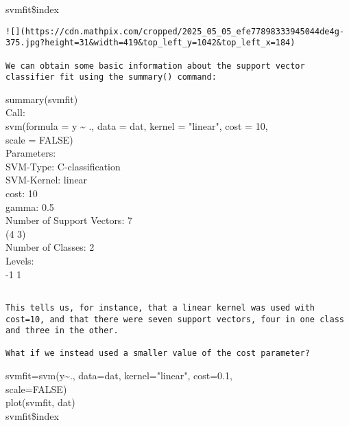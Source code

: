 \documentclass[10pt]{article}
\begin{document}
\begin{displayquote}
svmfit\$index
\end{displayquote}

\begin{verbatim}
![](https://cdn.mathpix.com/cropped/2025_05_05_efe77898333945044de4g-375.jpg?height=31&width=419&top_left_y=1042&top_left_x=184)

We can obtain some basic information about the support vector classifier fit using the summary() command:
\end{verbatim}

\begin{displayquote}
summary(svmfit)\\
Call:\\
svm(formula = y \~{} ., data = dat, kernel = "linear", cost = 10,\\
scale = FALSE)\\
Parameters:\\
SVM-Type: C-classification\\
SVM-Kernel: linear\\
cost: 10\\
gamma: 0.5\\
Number of Support Vectors: 7\\
(4 3)\\
Number of Classes: 2\\
Levels:\\
-1 1
\end{displayquote}

\begin{verbatim}

This tells us, for instance, that a linear kernel was used with cost=10, and that there were seven support vectors, four in one class and three in the other.

What if we instead used a smaller value of the cost parameter?
\end{verbatim}

\begin{displayquote}
svmfit=svm(y\~{}., data=dat, kernel="linear", cost=0.1,\\
scale=FALSE)\\
plot(svmfit, dat)\\
svmfit\$index
\end{displayquote}
\end{document}
